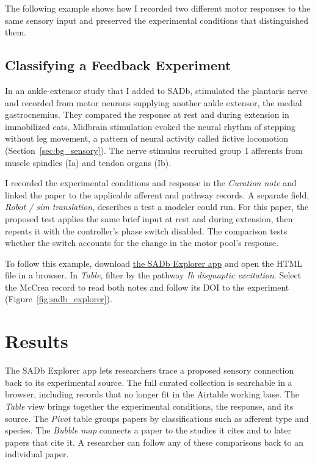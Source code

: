 The following example shows how I recorded two different motor responses to the same sensory input and preserved the experimental conditions that distinguished them.

\subsection{Classifying a Feedback Experiment}\label{sec:sadb_classification_example}

In an ankle-extensor study that I added to SADb, \citet{mccrea_disynaptic_1995} stimulated the plantaris nerve and recorded from motor neurons supplying another ankle extensor, the medial gastrocnemius. They compared the response at rest and during extension in immobilized cats. Midbrain stimulation evoked the neural rhythm of stepping without leg movement, a pattern of neural activity called fictive locomotion (Section~\ref{sec:bg_sensory}). The nerve stimulus recruited group~I afferents from muscle spindles (Ia) and tendon organs (Ib).

I recorded the experimental conditions and response in the \emph{Curation note} and linked the paper to the applicable afferent and pathway records. A separate field, \emph{Robot / sim translation}, describes a test a modeler could run. For this paper, the proposed test applies the same brief input at rest and during extension, then repeats it with the controller's phase switch disabled. The comparison tests whether the switch accounts for the change in the motor pool's response.

To follow this example, download \href{https://github.com/Agile-and-Adaptive-Robotics/Bipedal_Robot/blob/KneeTestSetup_BenBo_stw/SADb_audit/app/sadb_app.html}{the SADb Explorer app} and open the HTML file in a browser. In \emph{Table}, filter by the pathway \emph{Ib disynaptic excitation}. Select the McCrea record to read both notes and follow its DOI to the experiment (Figure~\ref{fig:sadb_explorer}).

\section{Results}\label{sec:sadb_corpus}

The SADb Explorer app lets researchers trace a proposed sensory connection back to its experimental source. The full curated collection is searchable in a browser, including records that no longer fit in the Airtable working base. The \emph{Table} view brings together the experimental conditions, the response, and its source. The \emph{Pivot} table groups papers by classifications such as afferent type and species. The \emph{Bubble map} connects a paper to the studies it cites and to later papers that cite it. A researcher can follow any of these comparisons back to an individual paper.

